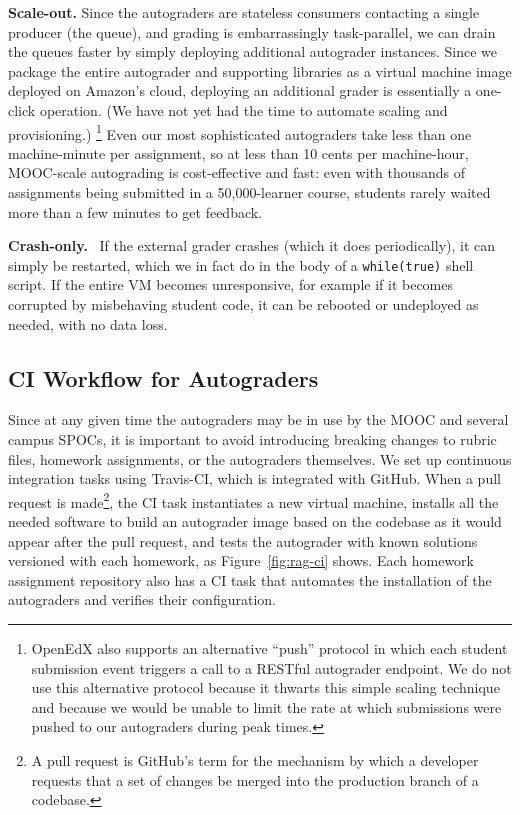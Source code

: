 \textbf{Scale-out.} 
Since the autograders are stateless consumers
contacting a single producer (the queue), and grading is
embarrassingly task-parallel, we can drain the queues faster by simply
deploying additional autograder instances.
Since we package the entire autograder and supporting libraries as a
virtual machine image deployed on Amazon's cloud, deploying an
additional grader is essentially a one-click operation. (We have not
yet had the time to automate scaling and provisioning.)
\footnote{OpenEdX also supports an alternative ``push'' protocol in which each student
submission event triggers a call to a RESTful autograder endpoint.
We do not use this
alternative protocol because it thwarts this simple scaling technique
and because we would be  unable to limit the rate at which
submissions were pushed to our autograders during peak times.}
Even our most sophisticated autograders take less than one
machine-minute per assignment, so at less than 10 cents per machine-hour,
MOOC-scale 
autograding is cost-effective and fast: even with
thousands of assignments being submitted in a 50,000-learner course,
students rarely waited more than a few minutes to get feedback.

\textbf{Crash-only.}~\cite{candea:crash-only}
If the external grader crashes (which it does periodically), it can
simply be restarted, which we in fact do in the
body of a \texttt{while(true)} shell script.
If the entire VM becomes unresponsive, for example if it becomes
corrupted by misbehaving student code, it can be rebooted or
undeployed as needed, with no data loss.

\subsection{CI Workflow for Autograders}

Since at any given time the autograders
may be in use by the MOOC and several campus SPOCs, it is important to 
avoid introducing breaking changes to rubric files, homework
assignments, or the autograders themselves.
We set up continuous
integration tasks using Travis-CI, which is integrated with GitHub.
When a pull request is made\footnote{A pull request is
  GitHub's term for the mechanism by which a developer requests that a
  set of changes 
  be merged into the production branch of a codebase.},  
the CI task instantiates  a
new virtual 
machine, installs all the needed software to build an autograder image
based on the codebase as it would appear after the pull request,
and tests the autograder with known solutions versioned with each homework, as
Figure~\ref{fig:rag-ci} shows.
Each homework assignment repository also has a CI task that
automates the installation of the autograders and verifies their
configuration. 

